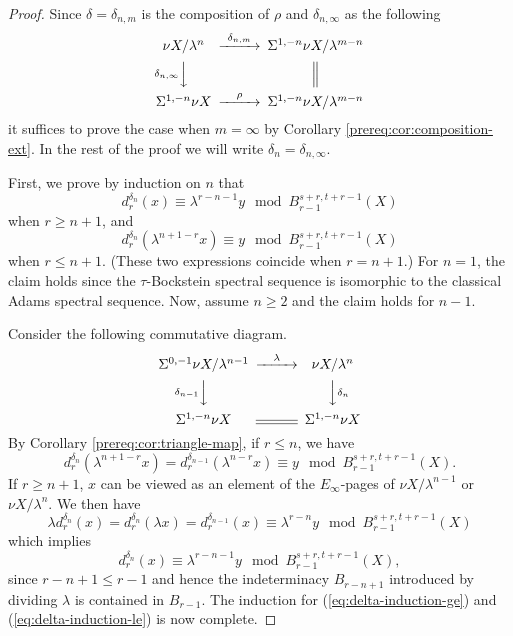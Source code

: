 \begin{proof}
    Since $\delta=\delta_{n,m}$ is the composition of $\rho$ and $\delta_{n,\infty}$ as the following
     $$\begin{CD}
    \nu X/\lambda^n @>{\delta_{n,m}}>> \Sus^{1,-n}\nu X/\lambda^{m-n} \\
    @V{\delta_{n,\infty}}VV @| \\
    \Sus^{1,-n}\nu X @>{\rho}>> \Sus^{1,-n}\nu X/\lambda^{m-n}
    \end{CD}$$
    it suffices to prove the case when $m=\infty$ by Corollary \ref{prereq:cor:composition-ext}. In the rest of the proof we will write $\delta_n=\delta_{n,\infty}$.

    First, we prove by induction on $n$ that
    \begin{equation}\label{eq:delta-induction-ge}
        d^{\delta_n}_r(x)\equiv \lambda^{r-n-1}y\mod B_{r-1}^{s+r,t+r-1}(X)
    \end{equation}
    when $r\ge n+1$, and
    \begin{equation}\label{eq:delta-induction-le}
        d^{\delta_n}_r(\lambda^{n+1-r}x)\equiv y\mod B_{r-1}^{s+r,t+r-1}(X)
    \end{equation}
    when $r\le n+1$. (These two expressions coincide when $r=n+1$.) For $n=1$, the claim holds since the $\tau$-Bockstein spectral sequence is isomorphic to the classical Adams spectral sequence. Now, assume $n\ge 2$ and the claim holds for $n-1$.
    
    Consider the following commutative diagram.
    $$\begin{CD}
    \Sus^{0,-1}\nu X/\lambda^{n-1} @>{\lambda}>> \nu X/\lambda^{n} \\
    @V{\delta_{n-1}}VV @VV{\delta_{n}}V \\
    \Sus^{1,-n}\nu X @= \Sus^{1,-n}\nu X
    \end{CD}$$
    By Corollary \ref{prereq:cor:triangle-map}, if $r\le n$, we have
    $$d^{\delta_{n}}_r(\lambda^{n+1-r}x)=d^{\delta_{n-1}}_r(\lambda^{n-r}x)\equiv y\mod B_{r-1}^{s+r,t+r-1}(X).$$
    If $r\ge n+1$, $x$ can be viewed as an element of the $E_\infty$-pages of $\nu X/\lambda^{n-1}$ or $\nu X/\lambda^n$. We then have
    $$\lambda d^{\delta_{n}}_r(x)=d^{\delta_{n}}_r(\lambda x)=d^{\delta_{n-1}}_r(x)\equiv \lambda^{r-n}y \mod B_{r-1}^{s+r,t+r-1}(X)$$
    which implies
    $$d^{\delta_{n}}_r(x)\equiv\lambda^{r-n-1}y\mod B_{r-1}^{s+r,t+r-1}(X),$$
    since $r-n+1\le r-1$ and hence the indeterminacy $B_{r-n+1}$ introduced by dividing $\lambda$ is contained in $B_{r-1}$. The induction for (\ref{eq:delta-induction-ge}) and (\ref{eq:delta-induction-le}) is now complete.


\end{proof}
